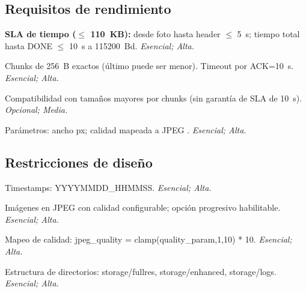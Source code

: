\documentclass[11pt,codirector]{charter}
\makeatletter
\newcommand{\SI}[2]{#1~#2}
\newcommand{\baud}{Bd}
\newcommand{\byte}{B}
\newcommand{\mytwodigits}[1]{\two@digits{#1}}
\newcounter{reqCounter}
\def\texttt#1{#1}%
\def\(\){}%
\makeatother
\begin{document}
	\subsection{Requisitos de rendimiento}
	\label{sec:sla}
	\begin{description}[leftmargin=1.8cm,style=nextline]
		\item[\textbf{[\CODrequerimiento\mytwodigits{\value{reqCounter}}]}]
		\textbf{SLA de tiempo (\texorpdfstring{$\leq$}{<=} 110~KB):} desde \texttt{foto} hasta header \texorpdfstring{$\leq$}{<=} \SI{5}{s}; tiempo total hasta \texttt{DONE} \texorpdfstring{$\leq$}{<=} \SI{10}{s} a \SI{115200}{\baud}. \emph{Esencial; Alta.}
		
		\item[\textbf{[\CODrequerimiento\mytwodigits{\value{reqCounter}}]}]
		Chunks de \SI{256}{\byte} exactos (último puede ser menor). Timeout por \texttt{ACK}=\SI{10}{s}. \emph{Esencial; Alta.}
		
		\item[\textbf{[\CODrequerimiento\mytwodigits{\value{reqCounter}}]}]
		Compatibilidad con tamaños mayores por chunks (sin garantía de SLA de \SI{10}{s}). \emph{Opcional; Media.}
		
		\item[\textbf{[\CODrequerimiento\mytwodigits{\value{reqCounter}}]}]
		Parámetros: ancho \([100,4608]\) px; calidad \([1,10]\) mapeada a JPEG \([10,100]\). \emph{Esencial; Alta.}
	\end{description}
	
	\subsection{Restricciones de diseño}
	\begin{description}[leftmargin=1.8cm,style=nextline]
		\item[\textbf{[\CODrequerimiento\mytwodigits{\value{reqCounter}}]}]
		Timestamps: \texttt{YYYYMMDD\_HHMMSS}. \emph{Esencial; Alta.}
		
		\item[\textbf{[\CODrequerimiento\mytwodigits{\value{reqCounter}}]}]
		Imágenes en JPEG con calidad configurable; opción progresivo habilitable. \emph{Esencial; Alta.}
		
		\item[\textbf{[\CODrequerimiento\mytwodigits{\value{reqCounter}}]}]
		Mapeo de calidad: \texttt{jpeg\_quality = clamp(quality\_param,1,10) * 10}. \emph{Esencial; Alta.}
		
		\item[\textbf{[\CODrequerimiento\mytwodigits{\value{reqCounter}}]}]
		Estructura de directorios: \texttt{storage/fullres}, \texttt{storage/enhanced}, \texttt{storage/logs}. \emph{Esencial; Alta.}
	\end{description}
	
\end{document}
